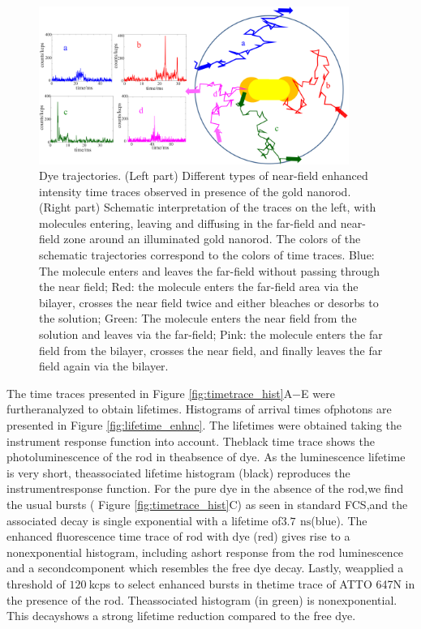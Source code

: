 \documentclass[journal=jpccck,manuscript=article]{achemso}
\newcommand{\ns}{\ensuremath{\,\textrm{ns}}}
\begin{document}
\begin{figure}
	\centering
	\includegraphics[width=0.9\textwidth]{enhnc_trajectories.png}
	\caption{Dye trajectories. (Left part) Different types of near-field enhanced intensity time traces observed in presence of the gold nanorod. (Right part) Schematic interpretation of the traces on the left, with molecules entering, leaving and diffusing in the far-field and near-field zone around an illuminated gold nanorod. The colors of the schematic trajectories correspond to the colors of time traces. Blue: The molecule enters and leaves the far-field without passing through the near field; Red: the molecule enters the far-field area via the bilayer, crosses the near field twice and either bleaches or desorbs to the solution; Green: The molecule enters the near field from the solution and leaves via the far-field; Pink: the molecule enters the far field from the bilayer, crosses the near field, and finally leaves the far field again via the bilayer.}
	\label{fig:enhnc_trajectories}
\end{figure}
The time traces presented in Figure \ref{fig:timetrace_hist}A−E were furtheranalyzed to obtain lifetimes. Histograms of arrival times ofphotons are presented in Figure \ref{fig:lifetime_enhnc}. The lifetimes were obtained taking the instrument response function into account. Theblack time trace shows the photoluminescence of the rod in theabsence of dye. As the luminescence lifetime is very short, theassociated lifetime histogram (black) reproduces the instrumentresponse function. For the pure dye in the absence of the rod,we ﬁnd the usual bursts ( Figure \ref{fig:timetrace_hist}C) as seen in standard FCS,and the associated decay is single exponential with a lifetime of$3.7~$\ns (blue). The enhanced ﬂuorescence time trace of rod with dye (red) gives rise to a nonexponential histogram, including ashort response from the rod luminescence and a secondcomponent which resembles the free dye decay. Lastly, weapplied a threshold of $120~$kcps to select enhanced bursts in thetime trace of ATTO 647N in the presence of the rod. Theassociated histogram (in green) is nonexponential. This decayshows a strong lifetime reduction compared to the free dye.\\
\end{document}
